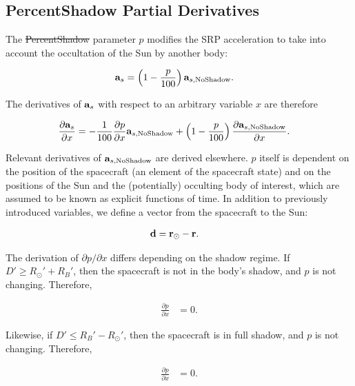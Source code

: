 
\subsection{PercentShadow Partial Derivatives} \label{Sec:ShadowParials}

The \st{PercentShadow} parameter $p$ modifies the SRP acceleration to take into account the occultation of the Sun by another body:

\begin{align}
	\mathbf{a}_s &= \left( 1 - \frac{p}{100} \right) \mathbf{a}_{s, \mathrm{No Shadow}}.
\end{align}

\noindent The derivatives of $\mathbf{a}_s$ with respect to an arbitrary variable $x$ are therefore

\begin{align}
	\frac{\partial \mathbf{a}_s}{\partial x} &= -\frac{1}{100} \frac{\partial p}{\partial x} \mathbf{a}_{s, \mathrm{No Shadow}} + \left( 1 - \frac{p}{100} \right) \frac{\partial  \mathbf{a}_{s, \mathrm{No Shadow}}}{\partial x}.
\end{align}

\noindent Relevant derivatives of $\mathbf{a}_{s, \mathrm{No Shadow}}$ are derived elsewhere. $p$ itself is dependent on the position of the spacecraft (an element of the spacecraft state) and on the positions of the Sun and the (potentially) occulting body of interest, which are assumed to be known as explicit functions of time. In addition to previously introduced variables, we define a vector from the spacecraft to the Sun:

\begin{align}
	\mathbf{d} &= \mathbf{r}_{\odot} - \mathbf{r}.
\end{align}

The derivation of $\partial p / \partial x$ differs depending on the shadow regime. If $D' \geq R_{\odot}' + R_B'$, then the spacecraft is not in the body's shadow, and $p$ is not changing. Therefore,

\begin{align}
	\frac{\partial p}{\partial x} &= 0.
\end{align}

\noindent Likewise, if $D' \leq R_B' - R_{\odot}'$, then the spacecraft is in full shadow, and $p$ is not changing. Therefore,

\begin{align}
\frac{\partial p}{\partial x} &= 0.
\end{align}

